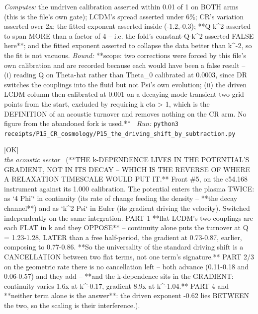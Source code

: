 \begin{description}
\emph{Computes:} the undriven calibration asserted within 0.01 of 1 on BOTH arms (this is the file's own gate); LCDM's spread asserted under 6\%; CR's variation asserted over 2x; the fitted exponent asserted inside (-1.2,-0.3); **Q k\textasciicircum{}2 asserted to span MORE than a factor of 4 -- i.e. the fold's constant-Q-k\textasciicircum{}2 asserted FALSE here**; and the fitted exponent asserted to collapse the data better than k\textasciicircum{}-2, so the fit is not vacuous.
 \emph{Bound:} **scope: two corrections were forced by this file's own calibration and are recorded because each would have been a false result -- (i) reading Q on Theta-hat rather than Theta\_0 calibrated at 0.0003, since DR switches the couplings into the fluid but not Psi's own evolution; (ii) the driven LCDM column then calibrated at 0.001 on a decaying-mode transient two grid points from the start, excluded by requiring k eta > 1, which is the DEFINITION of an acoustic turnover and removes nothing on the CR arm. No figure from the abandoned fork is used.**
\ \emph{Run:} \texttt{python3 receipts/P15\_CR\_cosmology/P15\_the\_driving\_shift\_by\_subtraction.py}
\item[\label{rcpt:P15_which_coupling_carries_the_k_dependence}\texttt{P15\_which\_coupling\_carries\_the\_k\_dependence}]\hfill\textsf{[OK]}\\
\textit{the acoustic sector} \ (**THE k-DEPENDENCE LIVES IN THE POTENTIAL'S GRADIENT, NOT IN ITS DECAY -- WHICH IS THE REVERSE OF WHERE A RELAXATION TIMESCALE WOULD PUT IT.** Front \#5, on the c54.168 instrument against its 1.000 calibration. The potential enters the plasma TWICE: as `4 Phi'` in continuity (its rate of change feeding the density -- **the decay channel**) and as `k\textasciicircum{}2 Psi` in Euler (its gradient driving the velocity). Switched independently on the same integration. PART 1 **flat LCDM's two couplings are each FLAT in k and they OPPOSE** -- continuity alone puts the turnover at Q = 1.23-1.28, LATER than a free half-period, the gradient at 0.73-0.87, earlier, composing to 0.77-0.86. **So the universality of the standard driving shift is a CANCELLATION between two flat terms, not one term's signature.** PART 2/3 on the geometric rate there is no cancellation left -- both advance (0.11-0.18 and 0.06-0.57) and they add -- **and the k-dependence sits in the GRADIENT: continuity varies 1.6x at k\textasciicircum{}-0.17, gradient 8.9x at k\textasciicircum{}-1.04.** PART 4 and **neither term alone is the answer**: the driven exponent -0.62 lies BETWEEN the two, so the scaling is their interference.). 

\end{description}
